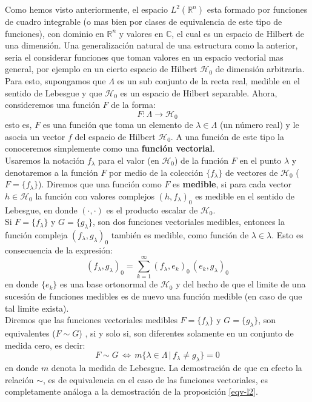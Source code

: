 \documentclass[12pt]{book}
\numberwithin{equation}{chapter}
\def\R{\mathbb{R}}
\def\C{\mathbb{C}}
\def\rar{\rightarrow}
\def\sss{\Leftrightarrow}
\def\H{\mathcal{H}}
\def\l{\lambda}
\begin{document}
Como hemos visto anteriormente, el espacio $L^{2} (\R^{n})$ esta formado por funciones de cuadro integrable (o mas bien por clases de equivalencia de este tipo de funciones), con dominio en $\R^{n}$ y valores en $\C$, el cual es un espacio de Hilbert de una dimensi\'on. Una generalizaci\'on natural de una estructura como la anterior, seria el considerar funciones que toman valores en un espacio vectorial mas general, por ejemplo en un cierto espacio de Hilbert $\H_{0}$ de dimensi\'on arbitraria. Para esto, supongamos que $\Lambda$ es un sub conjunto de la recta real, medible en el sentido de Lebesgue y que $\H_{0}$ es un espacio de Hilbert separable. Ahora, consideremos una funci\'on $F$ de la forma:
$$F: \Lambda \rar \H_{0}$$
esto es, $F$ es una funci\'on que toma un elemento de $\lambda \in \Lambda$ (un n\'umero real) y le asocia un vector $f$ del espacio de Hilbert $\H_{0}$. A una funci\'on de este tipo la conoceremos simplemente como una {\bf funci\'on vectorial}.\\
Usaremos la notaci\'on $f_{\lambda}$ para el valor (en $\H_{0}$) de la funci\'on $F$ en el punto $\lambda$ y denotaremos a la funci\'on $F$ por medio de la colecci\'on $ \{ f_{\lambda} \} $ de vectores de $\H_{0}$ ($F=\{ f_{\lambda} \}$). Diremos que una funci\'on como $F$ es {\bf medible}, si para cada vector $h \in \H_{0}$ la funci\'on con valores complejos $( h,f_{\lambda} )_{0}$ es medible en el sentido de Lebesgue, en donde $( \cdot , \cdot )$ es el producto escalar de $\H_{0}$.\\
Si $F=\{ f_{\lambda} \}$ y $G=\{ g_{\lambda} \}$, son dos funciones vectoriales medibles, entonces la funci\'on compleja $( f_{\lambda} , g_{\lambda} )_{0}$ tambi\'en es medible, como funci\'on de $\lambda \in \l$. Esto es consecuencia de la expresi\'on:
$$ ( f_{\lambda} , g_{\lambda} )_{0} = \sum_{k=1}^{\infty} ( f_{\lambda},e_{k} )_{0}\, (e_{k}, g_{\lambda} )_{0} $$
en donde $\{ e_{k} \}$ es una base ortonormal de $\H_{0}$ y del hecho de que el limite de una sucesi\'on de funciones medibles es de nuevo una funci\'on medible (en caso de que tal limite exista).\\
Diremos que las funciones vectoriales medibles $F=\{ f_{\lambda} \}$ y $G=\{ g_{\lambda} \}$, son equivalentes ($F \sim G$) , si y solo si, son diferentes solamente en un conjunto de medida cero, es decir:
\begin{equation}\label{eqv-2}
F \sim G \, \sss \, m\{ \lambda \in \Lambda \,|\, f_{\lambda} \neq g_{\lambda} \}=0
\end{equation}
en donde $m$ denota la medida de Lebesgue. La demostraci\'on de que en efecto la relaci\'on $\sim$, es de equivalencia en el caso de las funciones vectoriales, es completamente an\'aloga a la demostraci\'on de la proposici\'on \ref{eqv-l2}.\\
\end{document}
